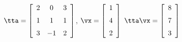 {$\tta =   \left[ \begin {array}{ccc} 2&0&3\\\noalign{\medskip}1&1&1
\\\noalign{\medskip}3&-1&2\end {array} \right]  $,\quad  
$\vx = \left[ \begin {array}{c} 1\\\noalign{\medskip}4\\\noalign{\medskip}2
\end {array} \right]$}
{$\tta\vx= \left[ \begin {array}{c} 8\\\noalign{\medskip}7\\\noalign{\medskip}3
\end {array} \right]$
}
 
